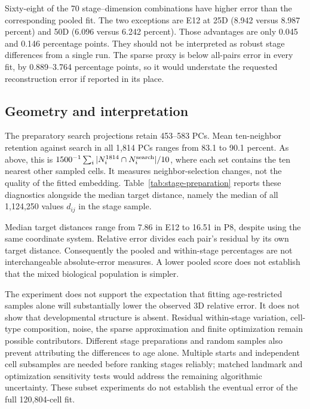 Sixty-eight of the 70 stage--dimension combinations have higher error than
the corresponding pooled fit. The two exceptions are E12 at 25D
(8.942 versus 8.987 percent) and 50D (6.096 versus 6.242 percent).
Those advantages are only 0.045 and 0.146 percentage points. They should
not be interpreted as robust stage differences from a single run.
The sparse proxy is below all-pairs error in every fit, by 0.889--3.764
percentage points, so it would understate the requested reconstruction
error if reported in its place.

\subsection{Geometry and interpretation}
The preparatory search projections retain 453--583 PCs. Mean ten-neighbor
retention against search in all 1,814 PCs ranges from 83.1 to 90.1 percent.
As above, this is
$1500^{-1}\sum_i |N_i^{1814}\cap N_i^{\rm search}|/10$,
where each set contains the ten nearest other sampled cells.
It measures neighbor-selection changes, not the quality of the fitted
embedding. Table~\ref{tab:stage-preparation} reports these diagnostics
alongside the median target distance, namely the median of all
1,124,250 values $d_{ij}$ in the stage sample.

\begin{table}[htbp]
\centering\small
\caption{Stage-specific preparation diagnostics. Search PCs is the number
of coordinates used only to select local neighbors. Neighbor retention
is the mean set-intersection fraction expressed as a percentage. Median
target distance is in the unscaled global PC coordinate units and
summarizes the within-stage distance distribution; it is not an error.
No target distances are replaced by search-projection distances.}
\label{tab:stage-preparation}
\end{table}
\FloatBarrier

Median target distances range from 7.86 in E12 to 16.51 in P8, despite
using the same coordinate system. Relative error divides each pair's
residual by its own target distance. Consequently the pooled and
within-stage percentages are not interchangeable absolute-error measures.
A lower pooled score does not establish that the mixed biological
population is simpler.

The experiment does not support the expectation that fitting age-restricted
samples alone will substantially lower the observed 3D relative error.
It does not show that developmental structure is absent. Residual
within-stage variation, cell-type composition, noise, the sparse
approximation and finite optimization remain possible contributors.
Different stage preparations and random samples also prevent attributing
the differences to age alone. Multiple starts and independent cell
subsamples are needed before ranking stages reliably; matched landmark
and optimization sensitivity tests would address the remaining algorithmic
uncertainty. These subset experiments do not establish the eventual error
of the full 120,804-cell fit.
